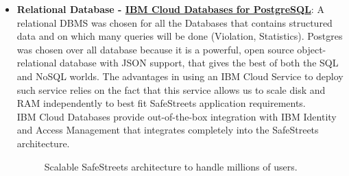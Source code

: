 \begin{itemize}
	\item \textbf{Relational Database - \href{https://cloud.ibm.com/catalog/services/databases-for-postgresql}{IBM Cloud Databases for PostgreSQL}}: A relational DBMS was chosen for all the Databases that contains structured data and on which many queries will be done (Violation, Statistics). Postgres was chosen over all database because it is a powerful, open source object-relational database with JSON support, that gives the best of both the SQL and NoSQL worlds. The advantages in using an IBM Cloud Service to deploy such service relies on the fact that this service allows us to scale disk and RAM independently to best fit SafeStreets application requirements.
	\\IBM Cloud Databases provide out-of-the-box integration with IBM Identity and Access Management that integrates completely into the SafeStreets architecture. 
	\begin{figure}[h!]
		\caption{Scalable SafeStreets architecture to handle millions of users.}
	\end{figure}
	\FloatBarrier
	
\end{itemize}
